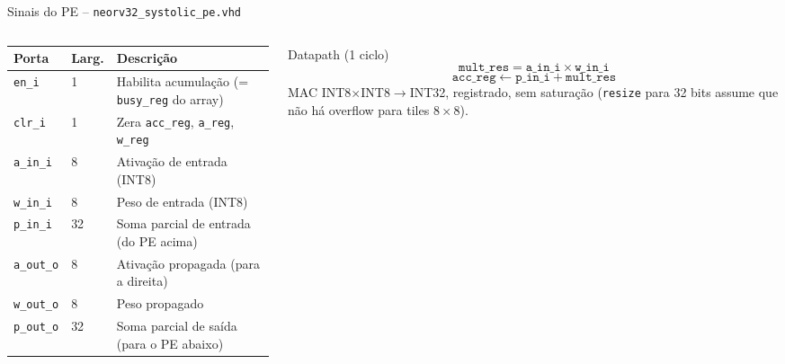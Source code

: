 \documentclass[aspectratio=169,10pt]{beamer}
\begin{document}
\begin{frame}{Sinais do PE -- \texttt{neorv32\_systolic\_pe.vhd}}
  \begin{columns}[T]
    \begin{column}{0.5\textwidth}
      \small
      \begin{tabularx}{\linewidth}{llX}
        \toprule
        \textbf{Porta} & \textbf{Larg.} & \textbf{Descrição} \\
        \midrule
        \texttt{en\_i}  & 1 & Habilita acumulação (= \texttt{busy\_reg} do array) \\
        \texttt{clr\_i} & 1 & Zera \texttt{acc\_reg}, \texttt{a\_reg}, \texttt{w\_reg} \\
        \texttt{a\_in\_i} & 8 & Ativação de entrada (INT8) \\
        \texttt{w\_in\_i} & 8 & Peso de entrada (INT8) \\
        \texttt{p\_in\_i} & 32 & Soma parcial de entrada (do PE acima) \\
        \texttt{a\_out\_o} & 8 & Ativação propagada (para a direita) \\
        \texttt{w\_out\_o} & 8 & Peso propagado \\
        \texttt{p\_out\_o} & 32 & Soma parcial de saída (para o PE abaixo) \\
        \bottomrule
      \end{tabularx}
    \end{column}
    \begin{column}{0.5\textwidth}
      \begin{block}{Datapath (1 ciclo)}
        \[
          \texttt{mult\_res} = \texttt{a\_in\_i} \times \texttt{w\_in\_i}
        \]
        \[
          \texttt{acc\_reg} \leftarrow \texttt{p\_in\_i} + \texttt{mult\_res}
        \]
        MAC INT8$\times$INT8$\to$INT32, registrado, sem saturação
        (\texttt{resize} para 32 bits assume que não há overflow para
        tiles $8\times8$).
      \end{block}
    \end{column}
  \end{columns}
\end{frame}
\end{document}
